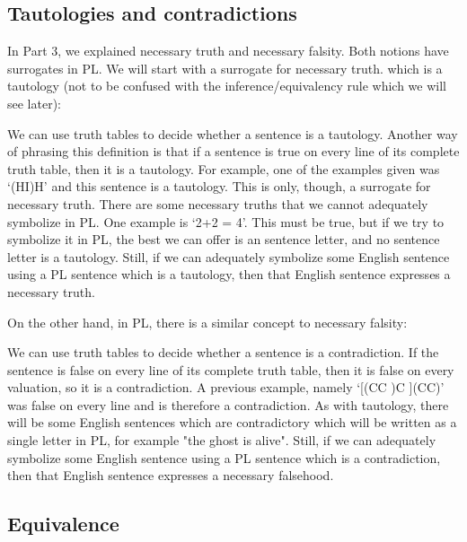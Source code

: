 \subsection{Tautologies and contradictions}

In Part 3, we explained necessary truth and necessary falsity. Both notions have surrogates in PL. We will start with a surrogate for necessary truth. which is a \gls{tautology} (not to be confused with the inference/equivalency rule which we will see later):


We can use truth tables to decide whether a sentence is a tautology. Another way of phrasing this definition is that if a sentence is true on every line of its complete truth table, then it is a tautology. For example, one of the examples given was ‘(H\eand I)\eif H’ and this sentence is a tautology. This is only, though, a surrogate for necessary truth. There are some necessary truths that we cannot adequately symbolize in PL. One example is ‘2+2 = 4’. This must be true, but if we try to symbolize it in PL, the best we can offer is an sentence letter, and no sentence letter is a tautology. Still, if we can adequately symbolize some English sentence using a PL sentence which is a tautology, then that English sentence expresses a necessary truth.

On the other hand, in PL, there is a similar concept to necessary falsity:


We can use truth tables to decide whether a sentence is a contradiction. If the sentence is false on every line of its complete truth table, then it is false on every valuation, so it is a contradiction. A previous example, namely ‘[(C\eiff C )\eif C ]\eand \enot (C\eif C)’ was false on every line and is therefore a contradiction. As with tautology, there will be some English sentences which are contradictory which will be written as a single letter in PL, for example "the ghost is alive". Still, if we can adequately symbolize some English sentence using a PL sentence which is a contradiction, then that English sentence expresses a necessary falsehood.

\subsection{Equivalence}

